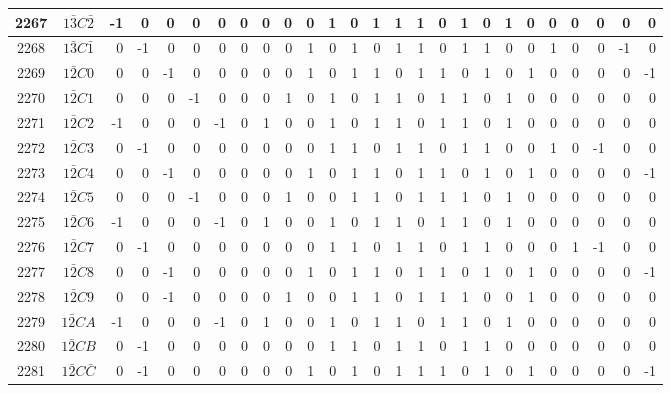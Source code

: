 \documentclass[12 pt]{article}%
\begin{document}
\begin{tiny}
\begin{centering}
\begin{longtable}{|c|c||rrrrrrrrrrrrrrrrrrrrrrrr|}
      \hline
      2267 & $1\bar3C\bar2$ & -1 & 0 & 0 & 0 & 0 & 0 & 0 & 0 & 0 & 1 & 0 & 1 & 1 & 1 & 0 & 1 & 0 & 1 & 0 & 0 & 0 & 0 & 0 & 0 \\
      \hline
      2268 & $1\bar3C\bar1$ & 0 & -1 & 0 & 0 & 0 & 0 & 0 & 0 & 1 & 0 & 1 & 0 & 1 & 1 & 0 & 1 & 1 & 0 & 0 & 1 & 0 & 0 & -1 & 0 \\
      \hline
      2269 & $1\bar2C0$ & 0 & 0 & -1 & 0 & 0 & 0 & 0 & 0 & 1 & 0 & 1 & 1 & 0 & 1 & 1 & 0 & 1 & 0 & 1 & 0 & 0 & 0 & 0 & -1 \\
      \hline
      2270 & $1\bar2C1$ & 0 & 0 & 0 & -1 & 0 & 0 & 0 & 1 & 0 & 1 & 0 & 1 & 1 & 0 & 1 & 1 & 0 & 1 & 0 & 0 & 0 & 0 & 0 & 0 \\
      \hline
      2271 & $1\bar2C2$ & -1 & 0 & 0 & 0 & -1 & 0 & 1 & 0 & 0 & 1 & 0 & 1 & 1 & 0 & 1 & 1 & 0 & 1 & 0 & 0 & 0 & 0 & 0 & 0 \\
      \hline
      2272 & $1\bar2C3$ & 0 & -1 & 0 & 0 & 0 & 0 & 0 & 0 & 0 & 1 & 1 & 0 & 1 & 1 & 0 & 1 & 1 & 0 & 0 & 1 & 0 & -1 & 0 & 0 \\
      \hline
      2273 & $1\bar2C4$ & 0 & 0 & -1 & 0 & 0 & 0 & 0 & 0 & 1 & 0 & 1 & 1 & 0 & 1 & 1 & 0 & 1 & 0 & 1 & 0 & 0 & 0 & 0 & -1 \\
      \hline
      2274 & $1\bar2C5$ & 0 & 0 & 0 & -1 & 0 & 0 & 0 & 1 & 0 & 0 & 1 & 1 & 0 & 1 & 1 & 1 & 0 & 1 & 0 & 0 & 0 & 0 & 0 & 0 \\
      \hline
      2275 & $1\bar2C6$ & -1 & 0 & 0 & 0 & -1 & 0 & 1 & 0 & 0 & 1 & 0 & 1 & 1 & 0 & 1 & 1 & 0 & 1 & 0 & 0 & 0 & 0 & 0 & 0 \\
      \hline
      2276 & $1\bar2C7$ & 0 & -1 & 0 & 0 & 0 & 0 & 0 & 0 & 0 & 1 & 1 & 0 & 1 & 1 & 0 & 1 & 1 & 0 & 0 & 0 & 1 & -1 & 0 & 0 \\
      \hline
      2277 & $1\bar2C8$ & 0 & 0 & -1 & 0 & 0 & 0 & 0 & 0 & 1 & 0 & 1 & 1 & 0 & 1 & 1 & 0 & 1 & 0 & 1 & 0 & 0 & 0 & 0 & -1 \\
      \hline
      2278 & $1\bar2C9$ & 0 & 0 & -1 & 0 & 0 & 0 & 0 & 1 & 0 & 0 & 1 & 1 & 0 & 1 & 1 & 1 & 0 & 0 & 1 & 0 & 0 & 0 & 0 & 0 \\
      \hline
      2279 & $1\bar2CA$ & -1 & 0 & 0 & 0 & -1 & 0 & 1 & 0 & 0 & 1 & 0 & 1 & 1 & 0 & 1 & 1 & 0 & 1 & 0 & 0 & 0 & 0 & 0 & 0 \\
      \hline
      2280 & $1\bar2CB$ & 0 & -1 & 0 & 0 & 0 & 0 & 0 & 0 & 0 & 1 & 1 & 0 & 1 & 1 & 0 & 1 & 1 & 0 & 0 & 0 & 0 & 0 & 0 & 0 \\
      \hline
      2281 & $1\bar2C\bar C$ & 0 & -1 & 0 & 0 & 0 & 0 & 0 & 0 & 1 & 0 & 1 & 0 & 1 & 1 & 1 & 0 & 1 & 0 & 1 & 0 & 0 & 0 & 0 & -1 \\

\end{longtable}
\end{centering}
\end{tiny}
\end{document}
